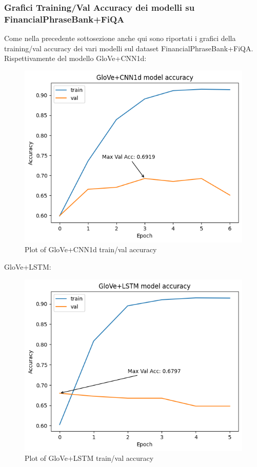 \subsubsection{Grafici Training/Val Accuracy dei modelli su FinancialPhraseBank+FiQA}
Come nella precedente sottosezione anche qui sono riportati i grafici della training/val accuracy dei vari modelli sul dataset FinancialPhraseBank+FiQA.\newline
Rispettivamente del modello GloVe+CNN1d:
\begin{figure}[!ht]
    \centering
    \includegraphics[width=12cm]{./images/acc_glove_cnn_2.png}
    \caption{Plot of GloVe+CNN1d train/val accuracy}
\end{figure}
\newline
GloVe+LSTM:
\begin{figure}[!ht]
    \centering
    \includegraphics[width=11.5cm]{./images/acc_glove_lstm_2.png}
    \caption{Plot of GloVe+LSTM train/val accuracy}
\end{figure}
